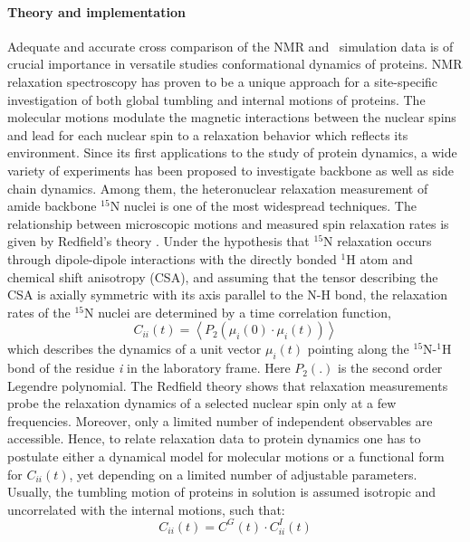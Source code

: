 \documentclass[a4paper,11pt]{report}
\begin{document}
\paragraph{Theory and implementation\\}
\label{op_theory}
Adequate and accurate cross comparison of the NMR and \MD\ simulation data is of crucial importance in versatile studies
conformational dynamics of proteins. NMR relaxation spectroscopy has proven to be a unique approach for a site-specific
investigation of both global tumbling and internal motions of proteins. The molecular motions modulate the magnetic 
interactions between the nuclear spins and lead for each nuclear spin to a relaxation behavior which reflects its environment. 
Since its first applications to the study of protein dynamics, a wide variety of experiments has been proposed to 
investigate backbone as well as side chain dynamics. Among them, the heteronuclear relaxation measurement of amide 
backbone $^{15}$N nuclei is one of the most widespread techniques. The relationship between microscopic motions and measured
spin relaxation rates is given by Redfield's theory \cite{Refield}. Under the hypothesis that $^{15}$N relaxation occurs through 
dipole-dipole interactions with the directly bonded $^{1}$H atom and chemical shift anisotropy (CSA), and assuming that the 
tensor describing the CSA is axially symmetric with its axis parallel to the N-H bond, the relaxation rates of the $^{15}$N 
nuclei are determined by a time correlation function,
\begin{equation}
\label{eq:op_cii}
C_{ii}(t) = \left\langle P_2(\mu_i(0) \cdot \mu_i(t)) \right\rangle
\end{equation}
which describes the dynamics of a unit vector $\mu_i(t)$ pointing along the $^{15}$N-$^{1}$H bond of the residue \textit{i} in the laboratory 
frame. Here $P_2(.)$ is the second order Legendre polynomial.
The Redfield theory shows that relaxation measurements probe the relaxation dynamics of a selected nuclear spin only at a 
few frequencies. Moreover, only a limited number of independent observables are accessible. Hence, to relate relaxation 
data to protein dynamics one has to postulate either a dynamical model for molecular motions or a functional form 
for $C_{ii}(t)$, yet depending on a limited number of adjustable parameters.
Usually, the tumbling motion of proteins in solution is assumed isotropic and uncorrelated with the internal motions, 
such that:
\begin{equation}
C_{ii}(t) = C^G(t) \cdot C^I_{ii}(t)
\end{equation}
\end{document}
